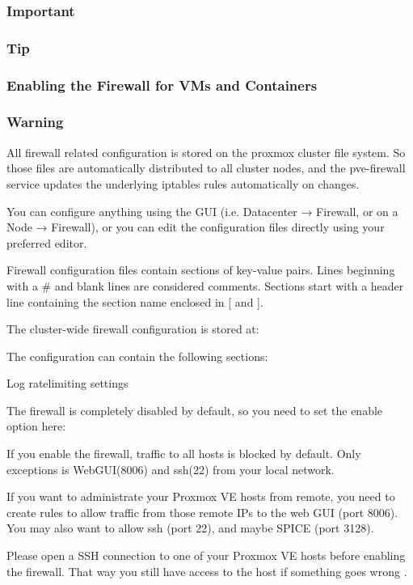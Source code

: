 \subsubsection{Important}

\subsubsection{Tip}

\subsubsection{Enabling the Firewall for VMs and Containers}

\subsubsection{Warning}

All firewall related configuration is stored on the proxmox cluster file system. So those files are automatically distributed to all cluster nodes, and the pve-firewall service updates the underlying iptables rules automatically on changes.

You can configure anything using the GUI (i.e. Datacenter → Firewall, or on a Node → Firewall), or you can edit the configuration files directly using your preferred editor.

Firewall configuration files contain sections of key-value pairs. Lines beginning with a # and blank lines are considered comments. Sections start with a header line containing the section name enclosed in [ and ].

The cluster-wide firewall configuration is stored at:

The configuration can contain the following sections:

Log ratelimiting settings

The firewall is completely disabled by default, so you need to set the enable option here:

If you enable the firewall, traffic to all hosts is blocked by default. Only exceptions is WebGUI(8006) and ssh(22) from your local network.

If you want to administrate your Proxmox VE hosts from remote, you need to create rules to allow traffic from those remote IPs to the web GUI (port 8006). You may also want to allow ssh (port 22), and maybe SPICE (port 3128).

Please open a SSH connection to one of your Proxmox VE hosts before enabling the firewall. That way you still have access to the host if something goes wrong .

